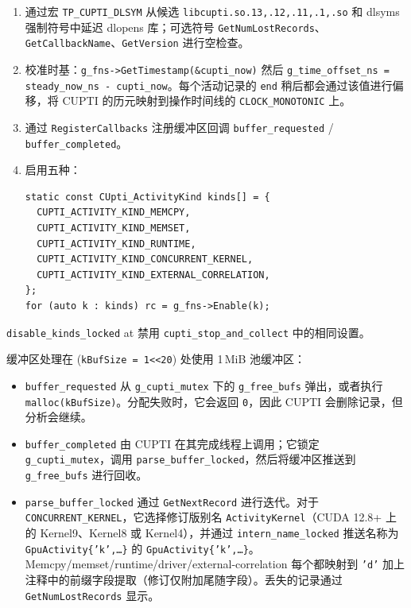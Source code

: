 \begin{enumerate}[leftmargin=1.4em]
\item 通过宏 \texttt{TP\_CUPTI\_DLSYM} 从候选 \texttt{libcupti.so.13,.12,.11,.1,.so} 和 dlsyms 强制符号中延迟 dlopens 库；可选符号 \texttt{GetNumLostRecords}、\texttt{GetCallbackName}、\texttt{GetVersion} 进行空检查。
\item 校准时基：\texttt{g\_fns->GetTimestamp(\&cupti\_now)} 然后 \texttt{g\_time\_offset\_ns = steady\_now\_ns - cupti\_now}。每个活动记录的 \texttt{end} 稍后都会通过该值进行偏移，将 CUPTI 的历元映射到操作时间线的 \texttt{CLOCK\_MONOTONIC} 上。
\item 通过 \texttt{RegisterCallbacks} 注册缓冲区回调 \texttt{buffer\_requested} / \texttt{buffer\_completed}。
\item 启用五种：
\begin{lstlisting}[caption={enabled kinds.}, label=lst:cuptiKinds, style=cppstyle]
static const CUpti_ActivityKind kinds[] = {
  CUPTI_ACTIVITY_KIND_MEMCPY,
  CUPTI_ACTIVITY_KIND_MEMSET,
  CUPTI_ACTIVITY_KIND_RUNTIME,
  CUPTI_ACTIVITY_KIND_CONCURRENT_KERNEL,
  CUPTI_ACTIVITY_KIND_EXTERNAL_CORRELATION,
};
for (auto k : kinds) rc = g_fns->Enable(k);
\end{lstlisting}
\end{enumerate}

\texttt{disable\_kinds\_locked} at 禁用 \texttt{cupti\_stop\_and\_collect} 中的相同设置。

缓冲区处理在 (\texttt{kBufSize = 1<<20}) 处使用 1\,MiB 池缓冲区：

\begin{itemize}[leftmargin=1.4em]
\item \texttt{buffer\_requested} 从 \texttt{g\_cupti\_mutex} 下的 \texttt{g\_free\_bufs} 弹出，或者执行 \texttt{malloc(kBufSize)}。分配失败时，它会返回 \texttt{0}，因此 CUPTI 会删除记录，但分析会继续。
\item \texttt{buffer\_completed} 由 CUPTI 在其完成线程上调用；它锁定 \texttt{g\_cupti\_mutex}，调用 \texttt{parse\_buffer\_locked}，然后将缓冲区推送到 \texttt{g\_free\_bufs} 进行回收。
\item \texttt{parse\_buffer\_locked} 通过 \texttt{GetNextRecord} 进行迭代。对于 \texttt{CONCURRENT\_KERNEL}，它选择修订版别名 \texttt{ActivityKernel}（CUDA 12.8+ 上的 Kernel9、Kernel8 或 Kernel4），并通过 \texttt{intern\_name\_locked} 推送名称为 \texttt{GpuActivity\{'k',\dots\}} 的 \texttt{GpuActivity\{'k',\dots\}}。 Memcpy/memset/runtime/driver/external-correlation 每个都映射到 \texttt{'d'} 加上注释中的前缀字段提取（修订仅附加尾随字段）。丢失的记录通过 \texttt{GetNumLostRecords} 显示。
\end{itemize}

